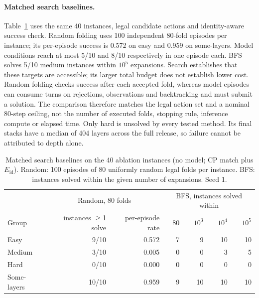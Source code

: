\paragraph{Matched search baselines.}
Table~\ref{tab:matched-baselines} uses the same 40 instances, legal candidate actions
and identity-aware success check. Random folding uses 100 independent 80-fold episodes
per instance; its per-episode success is 0.572 on easy and 0.959 on some-layers.
Model conditions reach at most 5/10 and 8/10 respectively in one episode each.
BFS solves 5/10 medium instances within $10^5$ expansions. Search establishes that
these targets are accessible; its larger total budget does not establish lower cost.
Random folding checks success after each accepted fold, whereas model episodes can
consume turns on rejections, observations and backtracking and must submit a solution.
The comparison therefore matches the legal action set and a nominal 80-step ceiling,
not the number of executed folds, stopping rule, inference compute or elapsed time.
Only hard is unsolved by every tested method. Its final stacks have a median of
404 layers across the full release, so failure cannot be attributed to depth alone.
\begin{table}[htbp]
\centering
\caption{Matched search baselines on the 40 ablation instances (no model; CP match plus
$E_{\mathrm{id}}$). Random: 100 episodes of 80 uniformly random legal folds per instance. BFS:
instances solved within the given number of expansions. Seed 1.}
\label{tab:matched-baselines}
\small
\setlength{\tabcolsep}{4pt}
\begin{tabular}{lrrrrrr}
\hline
 & \multicolumn{2}{c}{Random, 80 folds} & \multicolumn{4}{c}{BFS, instances solved within} \\
Group & instances $\geq$1 solve & per-episode rate & 80 & $10^3$ & $10^4$ & $10^5$ \\
\hline
Easy & 9/10 & 0.572 & 7 & 9 & 10 & 10 \\
Medium & 3/10 & 0.005 & 0 & 0 & 3 & 5 \\
Hard & 0/10 & 0.000 & 0 & 0 & 0 & 0 \\
Some-layers & 10/10 & 0.959 & 9 & 10 & 10 & 10 \\
\hline
\end{tabular}
\end{table}
